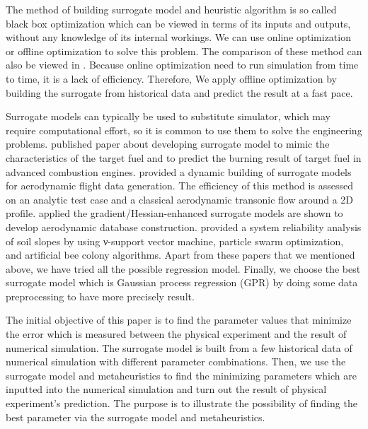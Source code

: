 The method of building surrogate model and heuristic algorithm is so called black box optimization which can be viewed in terms of its inputs and outputs, without any knowledge of its internal workings. We can use online optimization or offline optimization to solve this problem. The comparison of these method can also be viewed in \cite{barton2006metamodel}. Because online optimization need to run simulation from time to time, it is a lack of efficiency. Therefore, We apply offline optimization by building the surrogate from historical data and predict the result at a fast pace.

Surrogate models can typically be used to substitute simulator, which may require computational effort, so it is common to use them to solve the engineering problems. \cite{anand2011surrogate} published paper about developing surrogate model to mimic the characteristics of the target fuel and to predict the burning result of target fuel in advanced combustion engines. \cite{braconnier2011towards} provided a dynamic building of surrogate models for aerodynamic flight data generation. The efficiency of this method is assessed on an analytic test case and a classical aerodynamic transonic flow around a 2D profile. \cite{yamazaki2010design} applied the gradient/Hessian-enhanced surrogate models are shown to develop aerodynamic database construction. \cite{kang2016slope} provided a system reliability analysis of soil slopes by using ν-support vector machine, particle swarm optimization, and artificial bee colony algorithms. Apart from these papers that we mentioned above, we have tried all the possible regression model. Finally, we choose the best surrogate model which is Gaussian process regression (GPR) \cite{rasmussen2003gaussian} by doing some data preprocessing to have more precisely result. 

The initial objective of this paper is to find the parameter values that minimize the error which is measured between the physical experiment and the result of numerical simulation. The surrogate model is built from a few historical data of numerical simulation with different parameter combinations. Then, we use the surrogate model and metaheuristics to find the minimizing parameters which are inputted into the numerical simulation and turn out the result of physical experiment's prediction. The purpose is to illustrate the possibility of finding the best parameter via the surrogate model and metaheuristics.

